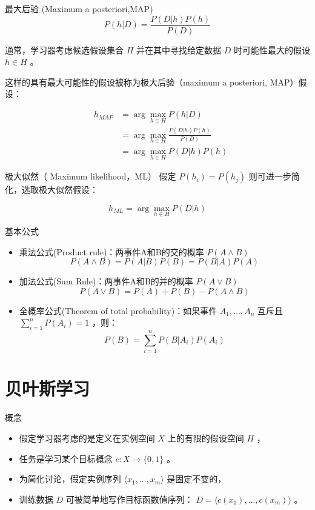 \documentclass[presentation]{beamer}
\begin{document}
\begin{frame}[label={sec:org22b0637}]{最大后验 (Maximum a posteriori,MAP)}
\[ P(h|D) = \frac{P(D|h) P(h)}{P(D)} \]

通常，学习器考虑候选假设集合 \(H\) 并在其中寻找给定数据 \(D\) 时可能性最大的假设 \(h\in H\) 。

这样的具有最大可能性的假设被称为极大后验（maximum a posteriori, MAP）假设：

\begin{eqnarray}
& h_{MAP} & = \arg \max_{h \in H} P(h|D)\nonumber \\
& & = \arg \max_{h \in H} \frac{P(D|h) P(h)}{P(D)} \nonumber \\
& & = \arg \max_{h \in H}P(D|h) P(h) \nonumber
\end{eqnarray}
\end{frame}

\begin{frame}[label={sec:org330441e}]{极大似然（ Maximum likelihood，ML）}
假定 \(P(h_{i})=P(h_{j})\) 则可进一步简化，选取极大似然假设：

$$h_{ML}=\arg \max_{h \in H}P(D|h)$$
\end{frame}

\begin{frame}[label={sec:org2020b5a}]{基本公式}
\begin{itemize}
\item 乘法公式(Product rule)：两事件A和B的交的概率 \(P(A \land B)\)
$$P(A \land B) = P(A|B) P(B) = P(B|A) P(A)$$
\item 加法公式(Sum Rule)：两事件A和B的并的概率 \(P(A\lor B)\)
$$P(A \lor B) = P(A) + P(B) - P(A \land B)$$
\item 全概率公式(Theorem of total probability)：如果事件 \(A_{1}, \ldots, A_{n}\) 互斥且 \(\sum_{i = 1}^{n} P(A_{i}) = 1\) ，则：
$$P(B) = \sum_{i = 1}^{n} P(B|A_{i}) P(A_{i})$$
\end{itemize}
\end{frame}

\section{贝叶斯学习}
\label{sec:orgae79e18}
\begin{frame}[label={sec:org5b24356}]{概念}
\begin{itemize}
\item 假定学习器考虑的是定义在实例空间 \(X\) 上的有限的假设空间 \(H\) ，
\item 任务是学习某个目标概念 \(c:X\rightarrow \{0,1\}\) 。
\item 为简化讨论，假定实例序列 \(\langle x_{1}, \ldots, x_{m}\rangle\) 是固定不变的，
\item 训练数据 \(D\) 可被简单地写作目标函数值序列： \(D = \langle c(x_{1}),\ldots, c(x_{m})\rangle\)  。
\end{itemize}
\end{frame}
\end{document}

